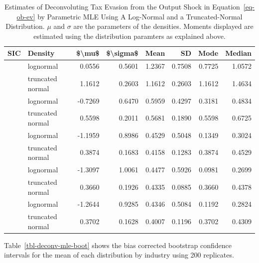 \documentclass[
  12pt]{article}
\theoremstyle{definition}
\theoremstyle{remark}
\begin{document}
\begin{longtable}[t]{llrrrrrr}

\caption{\label{tbl-deconv-mle-both}Estimates of Deconvoluting Tax
Evasion from the Output Shock in Equation~\ref{eq-ob-ev} by Parametric
MLE Using A Log-Normal and a Truncated-Normal Distribution. \(\mu\) and
\(\sigma\) are the parameters of the densities. Moments displayed are
estimated using the distribution paramters as explained above.}

\tabularnewline

\toprule
SIC & Density & \$\textbackslash{}mu\$ & \$\textbackslash{}sigma\$ & Mean & SD & Mode & Median\\
\midrule
 & lognormal & 0.0556 & 0.5601 & 1.2367 & 0.7508 & 0.7725 & 1.0572\\
\cmidrule{2-8}\nopagebreak
\multirow[t]{-2}{*}{\raggedright\arraybackslash 322} & truncated normal & 1.1612 & 0.2603 & 1.1612 & 0.2603 & 1.1612 & 1.4634\\
\cmidrule{1-8}\pagebreak[0]
 & lognormal & -0.7269 & 0.6470 & 0.5959 & 0.4297 & 0.3181 & 0.4834\\
\cmidrule{2-8}\nopagebreak
\multirow[t]{-2}{*}{\raggedright\arraybackslash 351} & truncated normal & 0.5598 & 0.2011 & 0.5681 & 0.1890 & 0.5598 & 0.6725\\
\cmidrule{1-8}\pagebreak[0]
 & lognormal & -1.1959 & 0.8986 & 0.4529 & 0.5048 & 0.1349 & 0.3024\\
\cmidrule{2-8}\nopagebreak
\multirow[t]{-2}{*}{\raggedright\arraybackslash 331} & truncated normal & 0.3874 & 0.1683 & 0.4158 & 0.1283 & 0.3874 & 0.4529\\
\cmidrule{1-8}\pagebreak[0]
 & lognormal & -1.3097 & 1.0061 & 0.4477 & 0.5926 & 0.0981 & 0.2699\\
\cmidrule{2-8}\nopagebreak
\multirow[t]{-2}{*}{\raggedright\arraybackslash 313} & truncated normal & 0.3660 & 0.1926 & 0.4335 & 0.0885 & 0.3660 & 0.4378\\
\cmidrule{1-8}\pagebreak[0]
 & lognormal & -1.2644 & 0.9285 & 0.4346 & 0.5084 & 0.1192 & 0.2824\\
\cmidrule{2-8}\nopagebreak
\multirow[t]{-2}{*}{\raggedright\arraybackslash 342} & truncated normal & 0.3702 & 0.1628 & 0.4007 & 0.1196 & 0.3702 & 0.4309\\
\bottomrule

\end{longtable}

Table~\ref{tbl-deconv-mle-boot} shows the bias corrected bootstrap
confidence intervals for the mean of each distribution by industry using
200 replicates.
\end{document}
